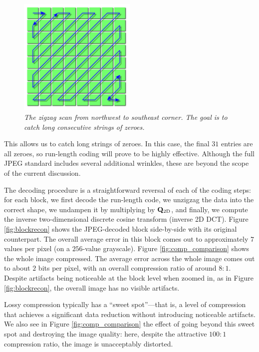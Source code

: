 \begin{figure}
	\centering
	\includegraphics[width=0.5\textwidth]{chap4/figures/zigzag.png}
	\caption{\em The zigzag scan from northwest to southeast corner. The goal is to catch long consecutive strings of zeroes.}
	\label{fig:zigzag}
\end{figure}

This allows us to catch long strings of zeroes. In this case, the final $31$ entries are all zeroes, so run-length coding will prove to be highly effective. Although the full JPEG standard includes several additional wrinkles, these are beyond the scope of the current discussion.

The decoding procedure is a straightforward reversal of each of the coding steps: for each block, we first decode the run-length code, we unzigzag the data into the correct shape, we undampen it by multiplying by $\mathbf{Q}_{\textrm{2D}}$, and finally, we compute the inverse two-dimensional discrete cosine transform (inverse 2D DCT). Figure \ref{fig:blockrecon} shows the JPEG-decoded block side-by-side with its original counterpart. The overall average error in this block comes out to approximately $7$ values per pixel (on a $256$-value grayscale). Figure \ref{fig:comp_comparison} shows the whole image compressed. The average error across the whole image comes out to about $2$ bits per pixel, with an overall compression ratio of around $8 : 1$. Despite artifacts being noticeable at the block level when zoomed in, as in Figure \ref{fig:blockrecon}, the overall image has no visible artifacts. 

Lossy compression typically has a ``sweet spot''---that is, a level of compression that achieves a significant data reduction without introducing noticeable artifacts. We also see in Figure \ref{fig:comp_comparison} the effect of going beyond this sweet spot and destroying the image quality: here, despite the attractive $100 : 1$ compression ratio, the image is unacceptably distorted.

